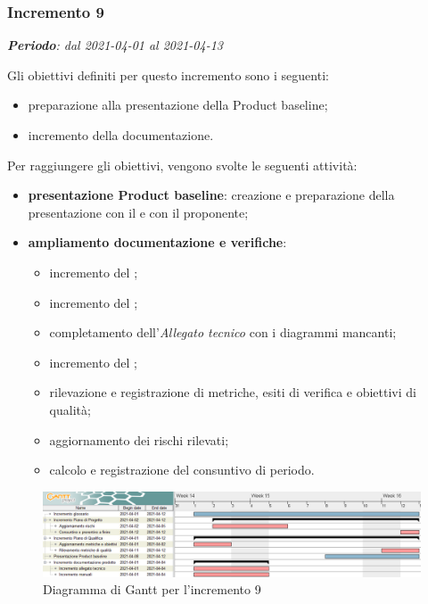 \subsubsection{Incremento 9}
\textit{\textbf{Periodo}: dal 2021-04-01 al 2021-04-13}

Gli obiettivi definiti per questo incremento sono i seguenti:
\begin{itemize}
\item preparazione alla presentazione della Product baseline;
\item incremento della documentazione.
\end{itemize}

Per raggiungere gli obiettivi, vengono svolte le seguenti attività:
\begin{itemize}
\item \textbf{presentazione Product baseline}: creazione e preparazione della presentazione con il \CR{} e con il proponente;
\item \textbf{ampliamento documentazione e verifiche}:
\begin{itemize}
\item incremento del \textit{\MU{}};
\item incremento del \textit{\MM{}};
\item completamento dell'\textit{Allegato tecnico} con i diagrammi mancanti;
\item incremento del ;
\item rilevazione e registrazione di metriche, esiti di verifica e obiettivi di qualità;
\item aggiornamento dei rischi rilevati;
\item calcolo e registrazione del consuntivo di periodo.
\end{itemize}

\end{itemize}
\begin{figure}[H]
\centering

\centerline{\includegraphics[scale=0.5]{res/Pianificazione/Fasi/CodificaIncrementi/ganttIncremento9}}
\caption{Diagramma di Gantt per l'incremento 9}
\end{figure}